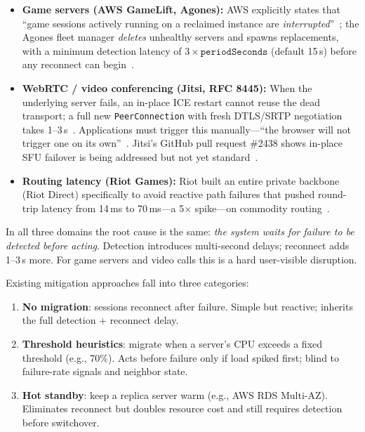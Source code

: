 \documentclass[review,1p]{elsarticle}
\theoremstyle{definition}
\begin{document}
\begin{itemize}
  \item \textbf{Game servers (AWS GameLift, Agones):} AWS explicitly
        states that ``game sessions actively running on a reclaimed
        instance are \emph{interrupted}''~\cite{awsgamelift}; the
        Agones fleet manager \emph{deletes} unhealthy servers and
        spawns replacements, with a minimum detection latency of
        $3 \times \mathtt{periodSeconds}$ (default 15\,s) before any
        reconnect can begin~\cite{agones}.
  \item \textbf{WebRTC / video conferencing (Jitsi, RFC 8445):}
        When the underlying server fails, an in-place ICE restart
        cannot reuse the dead transport; a full new \texttt{PeerConnection}
        with fresh DTLS/SRTP negotiation takes 1--3\,s~\cite{bloggeek}.
        Applications must trigger this manually---``the browser will
        not trigger one on its own''~\cite{mdnwebrtc}.  Jitsi's
        GitHub pull request \#2438 shows in-place SFU failover
        is being addressed but not yet standard~\cite{jitsi2438}.
  \item \textbf{Routing latency (Riot Games):} Riot built an entire
        private backbone (Riot Direct) specifically to avoid reactive
        path failures that pushed round-trip latency from 14\,ms to
        70\,ms---a 5$\times$ spike---on commodity routing~\cite{riotdirect}.
\end{itemize}

In all three domains the root cause is the same: \emph{the system waits
for failure to be detected before acting}.  Detection introduces
multi-second delays; reconnect adds 1--3\,s more.  For game servers and
video calls this is a hard user-visible disruption.

Existing mitigation approaches fall into three categories:
\begin{enumerate}
  \item \textbf{No migration}: sessions reconnect after failure.
        Simple but reactive; inherits the full detection + reconnect delay.
  \item \textbf{Threshold heuristics}: migrate when a server's CPU
        exceeds a fixed threshold (e.g., 70\%).
        Acts before failure only if load spiked first; blind to
        failure-rate signals and neighbor state.
  \item \textbf{Hot standby}: keep a replica server warm (e.g., AWS
        RDS Multi-AZ).  Eliminates reconnect but doubles resource cost
        and still requires detection before switchover.
\end{enumerate}
\end{document}
